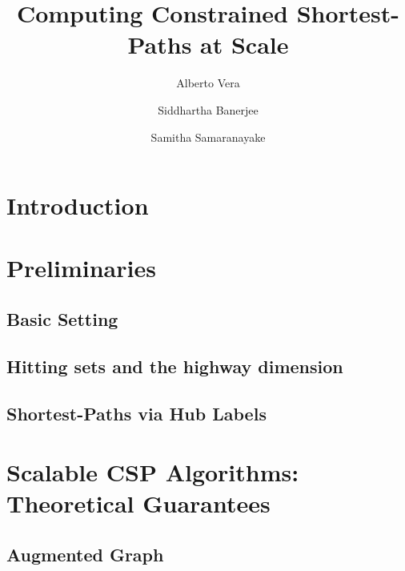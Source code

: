 \documentclass[format=acmsmall, screen=true]{acmart}
\begin{document}
\title{Computing Constrained Shortest-Paths at Scale}  
\author{Alberto Vera}
\author{Siddhartha Banerjee}
\author{Samitha Samaranayake}

\begin{abstract}

\end{abstract}

\maketitle


\section{Introduction}


\section{Preliminaries}
\label{sec:prelim}

\subsection{Basic Setting}
\label{ssec:basic}


\subsection{Hitting sets and the highway dimension}
\label{ssec:hddef}


\subsection{Shortest-Paths via Hub Labels}
\label{ssec:hldef}


\section{Scalable CSP Algorithms: Theoretical Guarantees}
\label{sec:chd}


\subsection{Augmented Graph}
\label{ssec:aug}

\end{document}
